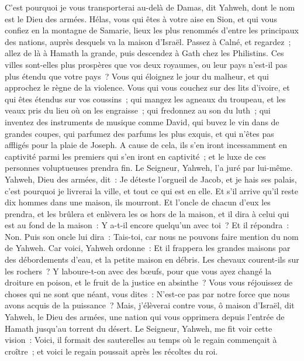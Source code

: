 \begin{multicols}{2}
C'est pourquoi je vous transporterai au-delà de Damas, dit Yahweh, dont le nom est le Dieu des armées.
\VerseOne{}Hélas, vous qui êtes à votre aise en Sion, et qui vous confiez en la montagne de Samarie, lieux les plus renommés d'entre les principaux des nations, auprès desquels va la maison d'Israël.
Passez à Calné, et regardez~; allez de là à Hamath la grande, puis descendez à Gath chez les Philistins. Ces villes sont-elles plus prospères que vos deux royaumes, ou leur pays n'est-il pas plus étendu que votre pays~?
Vous qui éloignez le jour du malheur, et qui approchez le règne de la violence.
Vous qui vous couchez sur des lits d'ivoire, et qui êtes étendus sur vos coussins~; qui mangez les agneaux du troupeau, et les veaux pris du lieu où on les engraisse~;
qui fredonnez au son du luth~; qui inventez des instruments de musique comme David,
qui buvez le vin dans de grandes coupes, qui parfumez des parfums les plus exquis, et qui n'êtes pas affligés pour la plaie de Joseph.
A cause de cela, ils s'en iront incessamment en captivité parmi les premiers qui s'en iront en captivité~; et le luxe de ces personnes voluptueuses prendra fin.
Le Seigneur, Yahweh, l'a juré par lui-même. Yahweh, Dieu des armées, dit~: Je déteste l'orgueil de Jacob, et je hais ses palais, c'est pourquoi je livrerai la ville, et tout ce qui est en elle.
Et s'il arrive qu'il reste dix hommes dans une maison, ils mourront.
Et l'oncle de chacun d'eux les prendra, et les brûlera et enlèvera les os hors de la maison, et il dira à celui qui est au fond de la maison~: Y a-t-il encore quelqu'un avec toi~? Et il répondra~: Non. Puis son oncle lui dira~: Tais-toi, car nous ne pouvons faire mention du nom de Yahweh.
Car voici, Yahweh ordonne~: Et il frappera les grandes maisons par des débordements d'eau, et la petite maison en débris.
Les chevaux courent-ils sur les rochers~? Y laboure-t-on avec des bœufs, pour que vous ayez changé la droiture en poison, et le fruit de la justice en absinthe~?
Vous vous réjouissez de choses qui ne sont que néant, vous dites~: N'est-ce pas par notre force que nous avons acquis de la puissance~?
Mais, j'élèverai contre vous, ô maison d'Israël, dit Yahweh, le Dieu des armées, une nation qui vous opprimera depuis l'entrée de Hamath jusqu'au torrent du désert.
\VerseOne{}Le Seigneur, Yahweh, me fit voir cette vision~: Voici, il formait des sauterelles au temps où le regain commençait à croître~; et voici le regain poussait après les récoltes du roi.

\end{multicols}
